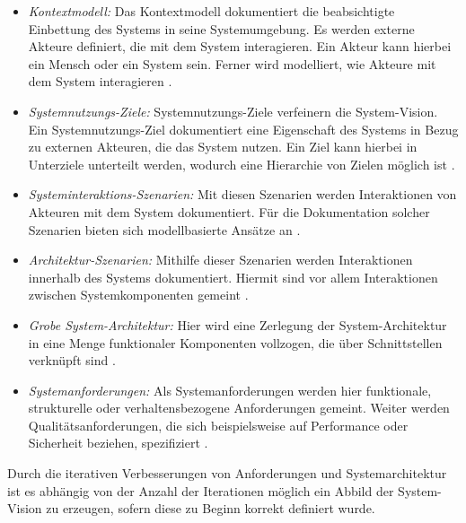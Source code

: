 \begin{itemize}
\item \emph{Kontextmodell:}
Das Kontextmodell dokumentiert die beabsichtigte Einbettung des Systems in seine Systemumgebung. Es werden externe Akteure definiert, die mit dem System interagieren. Ein Akteur kann hierbei ein Mensch oder ein System sein. Ferner wird modelliert, wie Akteure mit dem System interagieren \cite{Poh01}.
\item \emph{Systemnutzungs-Ziele:}
Systemnutzungs-Ziele verfeinern die System-Vision. Ein Systemnutzungs-Ziel dokumentiert eine Eigenschaft des Systems in Bezug zu externen Akteuren, die das System nutzen. Ein Ziel kann hierbei in Unterziele unterteilt werden, wodurch eine Hierarchie von Zielen m\"oglich ist \cite{Poh01}.  
\item \emph{Systeminteraktions-Szenarien:}
Mit diesen Szenarien werden Interaktionen von Akteuren mit dem System dokumentiert. F\"ur die Dokumentation solcher Szenarien bieten sich modellbasierte Ans\"atze an \cite{Poh01}.
\item \emph{Architektur-Szenarien:}
Mithilfe dieser Szenarien werden Interaktionen innerhalb des Systems dokumentiert. Hiermit sind vor allem Interaktionen zwischen Systemkomponenten gemeint \cite{Poh01}. 
\item \emph{Grobe System-Architektur:}
Hier wird eine Zerlegung der System-Architektur in eine Menge funktionaler Komponenten vollzogen, die \"uber Schnittstellen verkn\"upft sind \cite{Poh01}.
\item \emph{Systemanforderungen:}
Als Systemanforderungen werden hier funktionale, strukturelle oder verhaltensbezogene Anforderungen gemeint. Weiter werden Qualit\"atsanforderungen, die sich beispielsweise auf Performance oder Sicherheit beziehen, spezifiziert \cite{Poh01}.\\
\end{itemize}

Durch die iterativen Verbesserungen von Anforderungen und Systemarchitektur ist es abh\"angig von der Anzahl der Iterationen m\"oglich ein Abbild der System-Vision zu erzeugen, sofern diese zu Beginn korrekt definiert wurde.
